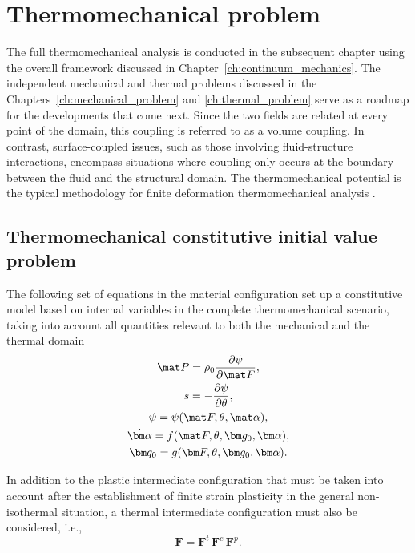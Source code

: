 \chapter{Thermomechanical problem}
\label{ch:thermo_mechanical_problem}

The full thermomechanical analysis is conducted in the subsequent chapter using the overall framework discussed in Chapter~\ref{ch:continuum_mechanics}.
The independent mechanical and thermal problems discussed in the Chapters~\ref{ch:mechanical_problem} and \ref{ch:thermal_problem} serve as a roadmap for the developments that come next.
Since the two fields are related at every point of the domain, this coupling is referred to as a volume coupling.
In contrast, surface-coupled issues, such as those involving fluid-structure interactions, encompass situations where coupling only occurs at the boundary between the fluid and the structural domain.
The thermomechanical potential is the typical methodology for finite deformation thermomechanical analysis \citep{danowski_computational_2014}.



\section{Thermomechanical constitutive initial value problem}

The following set of equations in the material configuration set up a constitutive model based on internal variables in the complete thermomechanical scenario, taking into account all quantities relevant to both the mechanical and the thermal domain
    \begin{gather}
        \mat P = \rho_0 \frac{\partial \psi}{\partial \mat F},\\
        s = - \frac{\partial \psi}{\partial \theta},\\
        \psi = \psi(\mat F,\theta, \mat \alpha),\label{eq:thermo_mech_helmholtz_free_energy}\\
        \dot{\bm \alpha} = f(\mat F, \theta, \bm g_0,\bm \alpha),\\
        \bm q_0 = g(\bm F, \theta, \bm g_0, \bm \alpha).
    \end{gather}

In addition to the plastic intermediate configuration that must be taken into account after the establishment of finite strain plasticity in the general non-isothermal situation, a thermal intermediate configuration must also be considered, i.e.,
\begin{equation}
  \bm F = \bm F^t\,\bm F^e\,\bm F^p.
\end{equation}

